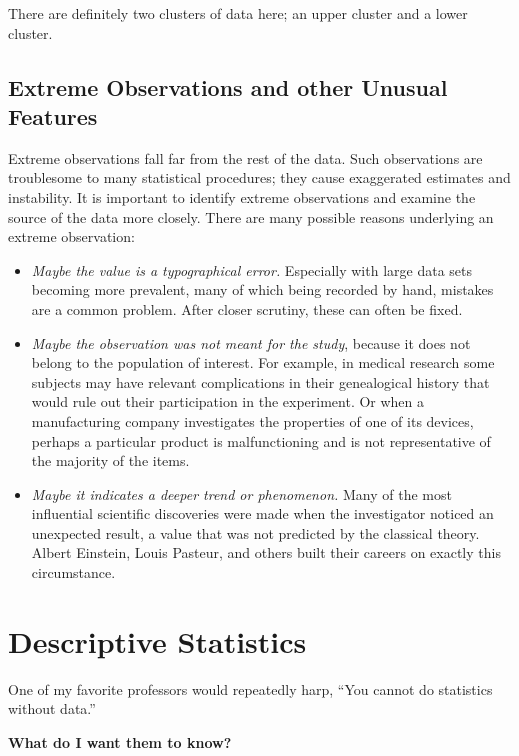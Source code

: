 \documentclass[]{book}
\providecommand{\tightlist}{%
  \setlength{\itemsep}{0pt}\setlength{\parskip}{0pt}}
\numberwithin{equation}{chapter}
\numberwithin{figure}{chapter}
\theoremstyle{plain}
\theoremstyle{definition}
\theoremstyle{remark}
\theoremstyle{definition}
\theoremstyle{definition}
\theoremstyle{remark}
\begin{document}
There are definitely two clusters of data here; an upper cluster and a
lower cluster.

\subsection{Extreme Observations and other Unusual
Features}\label{sub-extreme-observations}

Extreme observations fall far from the rest of the data. Such
observations are troublesome to many statistical procedures; they cause
exaggerated estimates and instability. It is important to identify
extreme observations and examine the source of the data more closely.
There are many possible reasons underlying an extreme observation:

\begin{itemize}
\tightlist
\item
  \emph{Maybe the value is a typographical error.} Especially with large
  data sets becoming more prevalent, many of which being recorded by
  hand, mistakes are a common problem. After closer scrutiny, these can
  often be fixed.
\item
  \emph{Maybe the observation was not meant for the study}, because it
  does not belong to the population of interest. For example, in medical
  research some subjects may have relevant complications in their
  genealogical history that would rule out their participation in the
  experiment. Or when a manufacturing company investigates the
  properties of one of its devices, perhaps a particular product is
  malfunctioning and is not representative of the majority of the items.
\item
  \emph{Maybe it indicates a deeper trend or phenomenon.} Many of the
  most influential scientific discoveries were made when the
  investigator noticed an unexpected result, a value that was not
  predicted by the classical theory. Albert Einstein, Louis Pasteur, and
  others built their careers on exactly this circumstance.
\end{itemize}

\section{Descriptive Statistics}\label{sec-descriptive-statistics}

One of my favorite professors would repeatedly harp, ``You cannot do
statistics without data.''

\textbf{What do I want them to know?}
\end{document}
